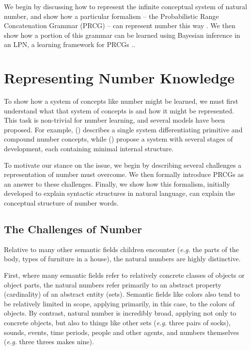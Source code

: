 \documentclass[10pt,letterpaper]{article}
\begin{document}
We begin by discussing how to represent the infinite conceptual system
of natural number, and show how a particular formalism -- the
Probabilistic Range Concatenation Grammar (PRCG) -- can represent
number this way \citep{boullier2005range}. We then show how a portion
of this grammar can be learned using Bayesian inference in an LPN, a
learning framework for PRCGs \citep{DecRulTen2015}..

\section{Representing Number Knowledge}

To show how a system of concepts like number might be learned, we must
first understand what that system of concepts is and how it might be
represented. This task is non-trivial for number learning, and several
models have been proposed. For example,
\citeauthor{hurford1975linguistic} (\citeyear{hurford1975linguistic})
describes a single system differentiating primitive and compound
number concepts, while \citeauthor{siegler1982development}
(\citeyear{siegler1982development}) propose a system with several
stages of development, each containing minimal internal structure.

To motivate our stance on the issue, we begin by describing several
challenges a representation of number must overcome. We then formally
introduce PRCGs as an answer to these challenges. Finally, we show how
this formalism, initially developed to explain syntactic structures in
natural language, can explain the conceptual structure of number
words.

\subsection{The Challenges of Number}

Relative to many other semantic fields children encounter ({\it e.g.}
the parts of the body, types of furniture in a house), the natural
numbers are highly distinctive.

First, where many semantic fields refer to relatively concrete classes
of objects or object parts, the natural numbers refer primarily to an
abstract property (cardinality) of an abstract entity (sets). Semantic
fields like colors also tend to be relatively limited in scope,
applying primarily, in this case, to the colors of objects. By
contrast, natural number is incredibly broad, applying not only to
concrete objects, but also to things like other sets ({\it e.g.} three
pairs of socks), sounds, events, time periods, people and other
agents, and numbers themselves ({\it e.g.} three threes makes nine).
\end{document}
